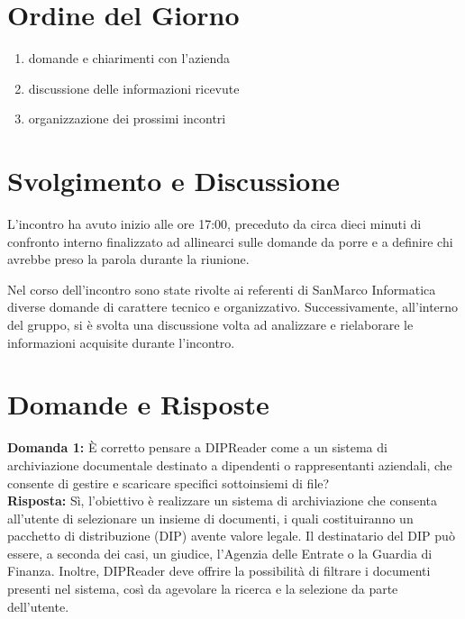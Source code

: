 \documentclass[a4paper,12pt]{article}
\begin{document}
\section{Ordine del Giorno}
\begin{enumerate}
    \item domande e chiarimenti con l'azienda  
    \item discussione delle informazioni ricevute 
    \item organizzazione dei prossimi incontri
\end{enumerate}
\vspace{0.5cm}
\section{Svolgimento e Discussione}
L’incontro ha avuto inizio alle ore 17:00, preceduto da circa dieci minuti di confronto interno finalizzato ad allinearci sulle domande da porre e a definire chi avrebbe preso la parola durante la riunione.

Nel corso dell’incontro sono state rivolte ai referenti di SanMarco Informatica diverse domande di carattere tecnico e organizzativo.
Successivamente, all’interno del gruppo, si è svolta una discussione volta ad analizzare e rielaborare le informazioni acquisite durante l’incontro.

\vspace{0.5cm}

\section{Domande e Risposte}

\textbf{Domanda 1:} È corretto pensare a DIPReader come a un sistema di archiviazione documentale destinato a dipendenti o rappresentanti aziendali, che consente di gestire e scaricare specifici sottoinsiemi di file? \\[0.5em]
\textbf{Risposta:} Sì, l’obiettivo è realizzare un sistema di archiviazione che consenta all’utente di selezionare un insieme di documenti, i quali costituiranno un pacchetto di distribuzione (DIP) avente valore legale.
Il destinatario del DIP può essere, a seconda dei casi, un giudice, l’Agenzia delle Entrate o la Guardia di Finanza.
Inoltre, DIPReader deve offrire la possibilità di filtrare i documenti presenti nel sistema, così da agevolare la ricerca e la selezione da parte dell’utente.

\vspace{2em}
\end{document}
